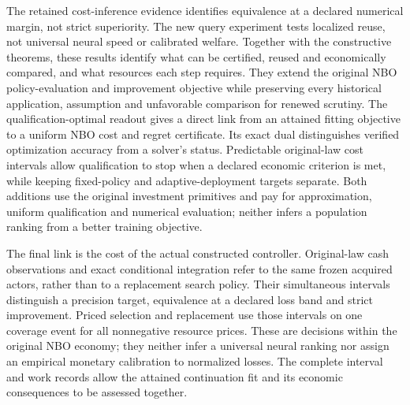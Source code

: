 \documentclass[ecta,nameyear,draft]{econsocart}
\begin{document}
The retained cost-inference evidence identifies equivalence at a declared numerical margin, not strict superiority. The new query experiment tests localized reuse, not universal neural speed or calibrated welfare. Together with the constructive theorems, these results identify what can be certified, reused and economically compared, and what resources each step requires. They extend the original NBO policy-evaluation and improvement objective while preserving every historical application, assumption and unfavorable comparison for renewed scrutiny.
The qualification-optimal readout gives a direct link from an attained fitting objective to a uniform NBO cost and regret certificate. Its exact dual distinguishes verified optimization accuracy from a solver's status. Predictable original-law cost intervals allow qualification to stop when a declared economic criterion is met, while keeping fixed-policy and adaptive-deployment targets separate. Both additions use the original investment primitives and pay for approximation, uniform qualification and numerical evaluation; neither infers a population ranking from a better training objective.

The final link is the cost of the actual constructed controller. Original-law cash observations and exact conditional integration refer to the same frozen acquired actors, rather than to a replacement search policy. Their simultaneous intervals distinguish a precision target, equivalence at a declared loss band and strict improvement. Priced selection and replacement use those intervals on one coverage event for all nonnegative resource prices. These are decisions within the original NBO economy; they neither infer a universal neural ranking nor assign an empirical monetary calibration to normalized losses. The complete interval and work records allow the attained continuation fit and its economic consequences to be assessed together.



\end{document}
